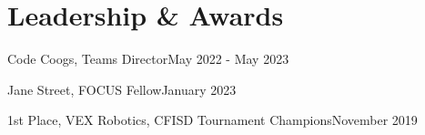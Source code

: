 \section{Leadership \& Awards}
\resumeSubHeadingListStart
    \AwardSubheading
    {Code Coogs, Teams Director}{May 2022 - May 2023}

    \AwardSubheading
    {Jane Street, FOCUS Fellow}{January 2023}
    
    \AwardSubheading
    {1st Place, VEX Robotics, CFISD Tournament Champions}{November 2019}
\resumeSubHeadingListEnd